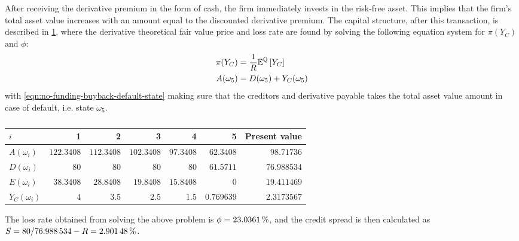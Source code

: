 \documentclass[../main.tex]{subfiles}
\begin{document}
            After receiving the derivative premium in the form of cash, the firm immediately invests in the risk-free asset. 
            This implies that the firm's total asset value increases with an amount equal to the discounted derivative premium. 
            The capital structure, after this transaction, is described in \cref{tbl:example-no-funding-buyback}, 
            where the derivative theoretical fair value price and loss rate are found
            by solving the following equation system for $\pi(Y_C)$ and $\phi$:
            \begin{align}
                \pi(Y_C) &= \frac{1}{R}\mathbb{E}^{\mathbb{Q}}\left[Y_{C}\right]
                \label{eqn:no-funding-buyback-derivative-fair-value}
                \\
                A(\omega_5) &= D(\omega_5) + Y_C(\omega_5)
                \label{eqn:no-funding-buyback-default-state}
            \end{align}
            with \cref{eqn:no-funding-buyback-default-state} making sure that the creditors and derivative payable
            takes the total asset value amount in case of default, i.e. state $\omega_5$.

            \begin{table}[H]
                \centering
                \begin{tabular}{l|rrrrr||r}
                    $i$ & 1 & 2 & 3 & 4 & 5 & Present value \\
                    \hline
                    $A(\omega_{i})$ & $\num{122.3408}$ & $\num{112.3408}$ & $\num{102.3408}$ & $\num{97.3408}$ & $\num{62.3408}$ & $\num{98.71736}$ \\
                    $D(\omega_{i})$ & $\num{80}$ & $\num{80}$ & $\num{80}$ & $\num{80}$ & $\num{61.5711}$ & $\num{76.988534}$ \\
                    $E(\omega_{i})$ & $38.3408$ & $\num{28.8408}$ & $\num{19.8408}$ & $\num{15.8408}$ & $\num{0}$ & $\num{19.411469}$ \\
                    $Y_C(\omega_{i})$ & $\num{4}$ & $\num{3.5}$ & $\num{2.5}$ & $\num{1.5}$ & $\num{0.769639}$ & $\num{2.3173567}$ \\
                \end{tabular}
                \caption{}
                \label{tbl:example-no-funding-buyback}
            \end{table}

            The loss rate obtained from solving the above problem is $\phi = \pct{0.230361}$, and the credit spread is then calculated as $S = \num{80}/\num{76.988534} - \grossrfrate = \pct{0.0290148}$.
\end{document}
